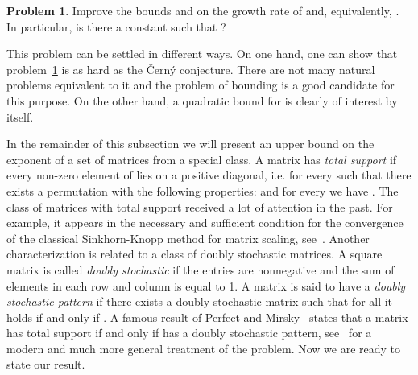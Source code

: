 \documentclass[a4paper,USenglish]{lipics}
\theoremstyle{definition}
\newtheorem{problem}[theorem]{Problem}
\begin{document}
\begin{problem}
\label{prob:rtnzrc}
Improve the bounds  and  on the growth rate of  and, equivalently, . In particular, is there a constant  such that ?
\end{problem}
This problem can be settled in different ways. On one hand, one can show that problem~\ref{prob:rtnzrc} is as hard as the \v{C}ern\'{y} conjecture. There are not many natural problems equivalent to it and the problem of bounding  is a good candidate for this purpose. On the other hand, a quadratic bound for  is clearly of interest by itself.

In the remainder of this subsection we will present an upper bound on the exponent of a set of matrices from a special class. A matrix  has \emph{total support} if every non-zero element  of  lies on a positive diagonal, i.e. for every  such that  there exists a permutation  with the following properties:  and for every  we have . The class of matrices with total support received a lot of attention in the past. For example, it appears in the necessary and sufficient condition for the convergence of the classical Sinkhorn-Knopp method for matrix scaling, see~\cite{SK67}. Another characterization is related to a class of doubly stochastic matrices.
A square matrix  is called \emph{doubly stochastic} if the entries are nonnegative and the sum of elements in each row and column is equal to 1.
A matrix  is said to have a \emph{doubly stochastic pattern} if there exists a doubly stochastic matrix  such that for all  it holds  if and only if . A famous result of Perfect and Mirsky~\cite{PM65} states that a matrix  has total support if and only if  has a doubly stochastic pattern, see~\cite[Theorem 9.2.1]{Bru06} for a modern and much more general treatment of the problem. Now we are ready to state our result.
\end{document}
